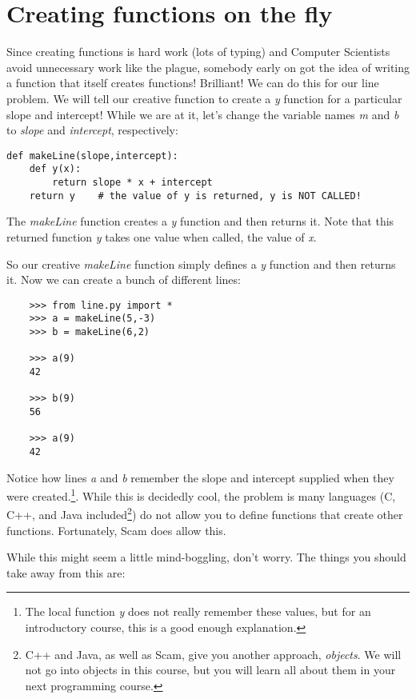 \section{Creating functions on the fly}

Since creating functions is hard work (lots of typing) and
Computer Scientists avoid unnecessary work like the plague, somebody
early on got the idea of writing a function that itself 
creates functions! Brilliant! We can do this for our line problem.
We will tell our creative function to create a {\it y} function
for a particular slope and intercept! While we are at it,
let's change the variable names {\it m} and {\it b} to {\it slope}
and {\it intercept}, respectively:

\begin{verbatim}
def makeLine(slope,intercept):
    def y(x):
        return slope * x + intercept
    return y    # the value of y is returned, y is NOT CALLED!
\end{verbatim}

The {\it makeLine} function creates a {\it y} function
and then returns it. Note that this returned function {\it y} takes
one value when called, the value of {\it x}.

So our creative {\it makeLine} function
simply defines a {\it y} function and then
returns it. Now we can create a bunch of different lines:

\begin{verbatim}
    >>> from line.py import *
    >>> a = makeLine(5,-3)
    >>> b = makeLine(6,2)

    >>> a(9)
    42
    
    >>> b(9)
    56

    >>> a(9)
    42
\end{verbatim}

Notice how lines {\it a} and {\it b} remember
the slope and intercept supplied
when they were created.\footnote{
The local function {\it y} does not really remember these values,
but for an introductory course, this is a good enough explanation.}.
While this is decidedly cool, the problem is many languages (C, C++, and Java
included\footnote{
C++ and Java, as well as Scam, give you another approach, {\it objects}.
We will not go into objects in this course, but
you will learn all about them in your next programming course.})
do not allow you to define functions that create other functions.
Fortunately, Scam does allow this.

While this might seem a little mind-boggling, don't worry. The
things you should take away from this are:

